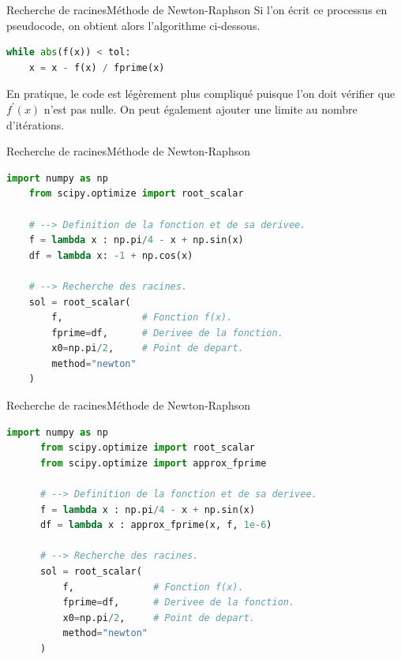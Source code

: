 \documentclass[usenames,dvipsnames,svgnames,10pt,aspectratio=169]{beamer}
\begin{document}
\begin{frame}[t, c, fragile]{Recherche de racines}{Méthode de Newton-Raphson}
  Si l'on écrit ce processus en pseudocode, on obtient alors l'algorithme ci-dessous.
  
  \bigskip
  
  \begin{lstlisting}[language=Python]
    while abs(f(x)) < tol:
    x = x - f(x) / fprime(x)
  \end{lstlisting}
  
  \medskip
  
  En pratique, le code est légèrement plus compliqué puisque l'on doit vérifier que $f^{\prime}(x)$ n'est pas nulle.
  On peut également ajouter une limite au nombre d'itérations.
\end{frame}

\begin{frame}[t, c, fragile]{Recherche de racines}{Méthode de Newton-Raphson}
  \begin{lstlisting}[language=Python]
    import numpy as np
    from scipy.optimize import root_scalar
    
    # --> Definition de la fonction et de sa derivee.
    f = lambda x : np.pi/4 - x + np.sin(x)
    df = lambda x: -1 + np.cos(x)
    
    # --> Recherche des racines.
    sol = root_scalar(
        f,              # Fonction f(x).
        fprime=df,      # Derivee de la fonction.
        x0=np.pi/2,     # Point de depart.
        method="newton"
    )

  \end{lstlisting}
\end{frame}

\begin{frame}[t, c, fragile]{Recherche de racines}{Méthode de Newton-Raphson}
  \begin{minipage}{.68\textwidth}
    \begin{lstlisting}[language=Python]
      import numpy as np
      from scipy.optimize import root_scalar
      from scipy.optimize import approx_fprime
      
      # --> Definition de la fonction et de sa derivee.
      f = lambda x : np.pi/4 - x + np.sin(x)
      df = lambda x : approx_fprime(x, f, 1e-6)
      
      # --> Recherche des racines.
      sol = root_scalar(
          f,              # Fonction f(x).
          fprime=df,      # Derivee de la fonction.
          x0=np.pi/2,     # Point de depart.
          method="newton"
      )
    \end{lstlisting}
  \end{minipage}%
  \hfill
  \begin{minipage}{.28\textwidth}
  \end{minipage}
\end{frame}
\end{document}

